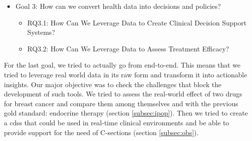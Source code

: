 \begin{itemize}
    \item Goal 3: How can we convert health data into decisions and policies?
    \begin{itemize}
        \item RQ3.1: How Can We Leverage Data to Create Clinical Decision Support Systems?
        \item RQ3.2: How Can We Leverage Data to Assess Treatment Efficacy?
    \end{itemize}    
\end{itemize}

For the last goal, we tried to actually go from end-to-end. This means that we tried to leverage real world data in its raw form and transform it into actionable insights. Our major objective was to check the challenges that block the development of such tools. We tried to assess the real-world effect of two drugs for breast cancer and compare them among themselves and with the previous gold standard: endocrine therapy (section \ref{subsec:ipop}). Then we tried to create a \ac{cdss} that could be used in real-time clinical environments and be able to provide support for the need of C-sections (section \ref{subsec:obs}). 